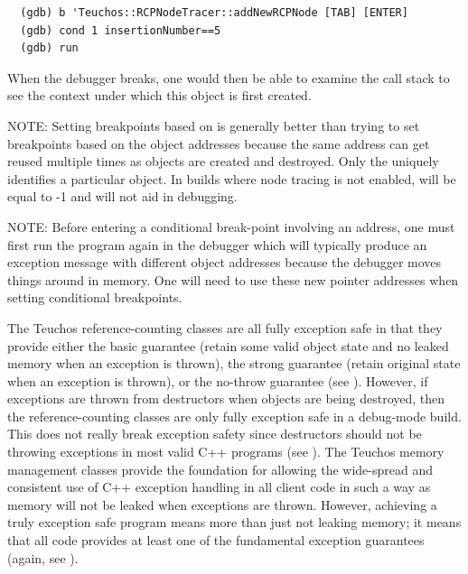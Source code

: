 \documentclass[pdf,ps2pdf,11pt]{SANDreport}
\begin{document}
{\small\begin{verbatim}
  (gdb) b 'Teuchos::RCPNodeTracer::addNewRCPNode [TAB] [ENTER]
  (gdb) cond 1 insertionNumber==5
  (gdb) run
\end{verbatim}}

When the debugger breaks, one would then be able to examine the call
stack to see the context under which this {} object is
first created.

NOTE: Setting breakpoints based on {} is
generally better than trying to set breakpoints based on the object
addresses because the same address can get reused multiple times as
objects are created and destroyed.  Only the {}
uniquely identifies a particular {} object.  In builds
where node tracing is not enabled, {} will be
equal to -1 and will not aid in debugging.

NOTE: Before entering a conditional break-point involving an address,
one must first run the program again in the debugger which will
typically produce an exception message with different object addresses
because the debugger moves things around in memory.  One will need to
use these new pointer addresses when setting conditional breakpoints.

The Teuchos reference-counting classes are all fully exception safe in
that they provide either the basic guarantee (retain some valid object
state and no leaked memory when an exception is thrown), the strong
guarantee (retain original state when an exception is thrown), or the
no-throw guarantee (see {}\cite[Item 71]{C++CodingStandards05}).
However, if exceptions are thrown from destructors when objects are
being destroyed, then the reference-counting classes are only fully
exception safe in a debug-mode build.  This does not really break
exception safety since destructors should not be throwing exceptions
in most valid C++ programs (see {}\cite[Item
51]{C++CodingStandards05}).  The Teuchos memory management classes
provide the foundation for allowing the wide-spread and consistent use
of C++ exception handling in all client code in such a way as memory
will not be leaked when exceptions are thrown.  However, achieving a
truly exception safe program means more than just not leaking memory;
it means that all code provides at least one of the fundamental
exception guarantees (again, see {}\cite[Item
71]{C++CodingStandards05}).
\end{document}
